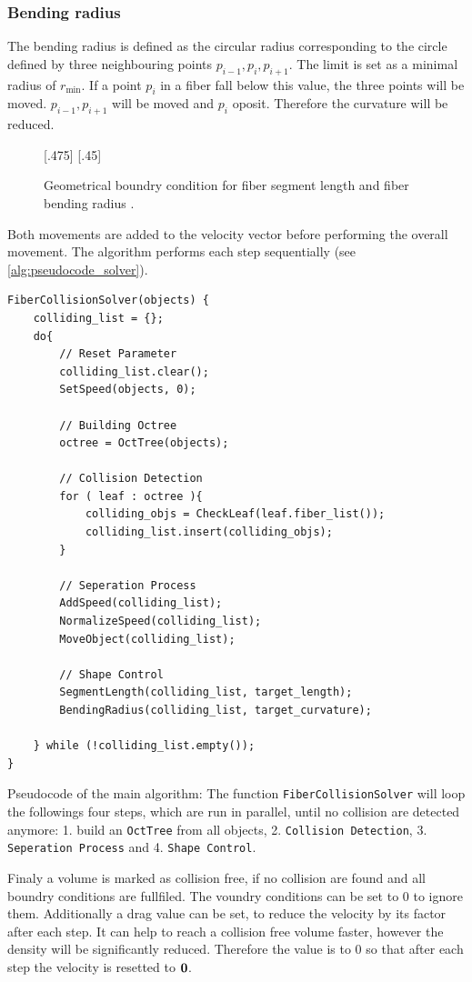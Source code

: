 \subsubsection{Bending radius}
% 
The bending radius is defined as the circular radius corresponding to the circle defined by three neighbouring points $p_{i-1}, p_{i}, p_{i+1}$. 
The limit is set as a minimal radius of $r_{\min}$.
If a point $p_{i}$ in a fiber fall below this value, the three points will be moved.
$p_{i-1},p_{i+1}$ will be moved \dummy and $p_{i}$ oposit.
Therefore the curvature will be reduced.
% 
\begin{figure}[!t]
    \centering
    \def\tikzheight{.42\textwidth}
    [.475\textwidth]{
    }\hfill
    [.45\textwidth]{
    }
	\caption{Geometrical boundry condition for fiber segment length \segLength and fiber bending radius \segRadius.}
	\label{fig:model_circle_}
\end{figure}
% 
\newline
Both movements are added to the velocity vector before performing the overall movement.
The algorithm performs each step sequentially (see \cref{alg:pseudocode_solver}).
\begin{lstfloat}[!tb]
\lstset{style=cpp}

\begin{lstlisting}[]
FiberCollisionSolver(objects) {
	colliding_list = {};
	do{
		// Reset Parameter
		colliding_list.clear();
		SetSpeed(objects, 0);
		
		// Building Octree
		octree = OctTree(objects);
		
		// Collision Detection
		for ( leaf : octree ){
			colliding_objs = CheckLeaf(leaf.fiber_list());
			colliding_list.insert(colliding_objs);
		}
		
		// Seperation Process
		AddSpeed(colliding_list);
		NormalizeSpeed(colliding_list);
		MoveObject(colliding_list);
		
		// Shape Control
		SegmentLength(colliding_list, target_length);
		BendingRadius(colliding_list, target_curvature);
		
	} while (!colliding_list.empty());
}
\end{lstlisting}
\caption{Pseudocode of the main algorithm: The function \texttt{FiberCollisionSolver} will loop the followings four steps, which are run in parallel, until no collision are detected anymore: 1. build an \texttt{OctTree} from all objects, 2. \texttt{Collision Detection}, 3. \texttt{Seperation Process} and 4. \texttt{Shape Control}.}
\label{alg:pseudocode_solver}
\end{lstfloat}
% 
Finaly a volume is marked as collision free, if no collision are found and all boundry conditions are fullfiled. 
The voundry conditions can be set to 0 to ignore them.
Additionally a drag value can be set, to reduce the velocity by its factor after each step.
It can help to reach a collision free volume faster, however the density will be significantly reduced.
Therefore the value is to 0 so that after each step the velocity is resetted to $\mathbf{0}$. 
% 
% 
